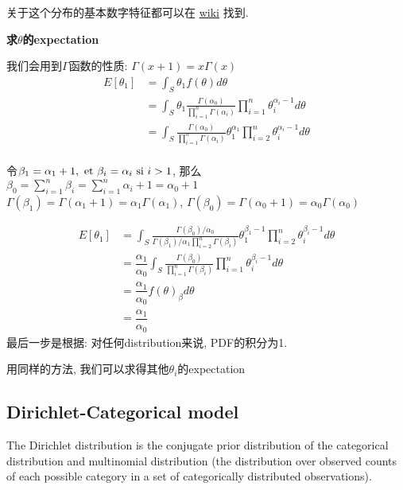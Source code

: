 \documentclass{article}
\begin{document}
关于这个分布的基本数字特征都可以在
\href{http://en.wikipedia.org/wiki/Dirichlet\_distribution}{wiki}
找到.

\textbf{求$\theta$的expectation}

我们会用到$\Gamma$函数的性质: $\Gamma(x+1) = x \Gamma(x)$
$$
\begin{aligned}
E[\theta_1]
& = \int_S \theta_1 f(\theta) d\theta \\
& = \int_S \theta_1 \frac{\Gamma(\alpha_0)}{\prod_{i=1}^n \Gamma(\alpha_i)} \prod_{i=1}^n \theta_i^{\alpha_i - 1} d\theta \\
& = \int_S \frac{\Gamma(\alpha_0)}{\prod_{i=1}^n \Gamma(\alpha_i)} \theta_1^{\alpha_1} \prod_{i=2}^n \theta_i^{\alpha_i - 1} d\theta \\
\end{aligned}
$$

令$\beta_1 = \alpha_1 + 1,\textrm{\ et } \beta_i =  \alpha_i \textrm{\ si } i > 1$, 那么 \\
$\beta_0 = \sum_{i = 1}^n \beta_i = \sum_{i = 1}^n \alpha_i + 1 = \alpha_0 + 1$ \\
$\Gamma(\beta_1) = \Gamma(\alpha_1 + 1) = \alpha_1 \Gamma(\alpha_1)$, 
$\Gamma(\beta_0) = \Gamma(\alpha_0 + 1) = \alpha_0 \Gamma(\alpha_0)$

$$
\begin{aligned}
E[\theta_1]
& = \int_S \frac{\Gamma(\beta_0) / \alpha_0}{\Gamma(\beta_1) / \alpha_1 \prod_{i=2}^n \Gamma(\beta_i)} \theta_1^{\beta_1 - 1} \prod_{i=2}^n \theta_i^{\beta_i - 1} d\theta \\
& = \dfrac{\alpha_1}{\alpha_0} \int_S \frac{\Gamma(\beta_0)}{\prod_{i=1}^n \Gamma(\beta_i)} \prod_{i=1}^n \theta_i^{\beta_i - 1} d\theta \\
& = \dfrac{\alpha_1}{\alpha_0} f(\theta)_\beta d\theta \\
& = \dfrac{\alpha_1}{\alpha_0}
\end{aligned}
$$
最后一步是根据: 对任何distribution来说, PDF的积分为1.

用同样的方法, 我们可以求得其他$\theta_i$的expectation

\subsection{Dirichlet-Categorical model}
The Dirichlet distribution is the conjugate prior distribution of the categorical distribution
and multinomial distribution (the distribution over observed counts of each possible category in a set of categorically distributed observations).
\end{document}
